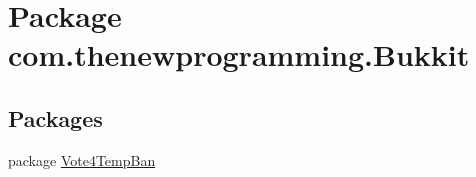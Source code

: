 \hypertarget{namespacecom_1_1thenewprogramming_1_1_bukkit}{\section{Package com.\-thenewprogramming.\-Bukkit}
\label{namespacecom_1_1thenewprogramming_1_1_bukkit}
}
\subsection*{Packages}
\begin{DoxyCompactItemize}
\item 
package \hyperlink{namespacecom_1_1thenewprogramming_1_1_bukkit_1_1_vote4_temp_ban}{Vote4\-Temp\-Ban}
\end{DoxyCompactItemize}
